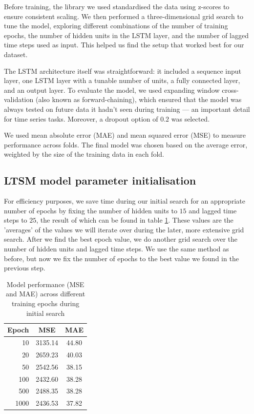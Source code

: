 \documentclass[conference]{IEEEtran}
\begin{document}
Before training, the library we used standardised the data using z-scores to ensure consistent scaling. We 
then performed a three-dimensional grid search to tune the model, exploring different combinations of the 
number of training epochs, the number of hidden units in the LSTM layer, and the number of lagged time 
steps used as input. This helped us find the setup that worked best for our dataset.

The LSTM architecture itself was straightforward: it included a sequence input layer, one LSTM layer with 
a tunable number of units, a fully connected layer, and an output layer. To evaluate the model, we used 
expanding window cross-validation (also known as forward-chaining), which ensured that the model was 
always tested on future data it hadn’t seen during training — an important detail for time series tasks.
Moreover, a dropout option of $0.2$ was selected.

We used mean absolute error (MAE) and mean squared error (MSE) to measure performance across folds. The 
final model was chosen based on the average error, weighted by the size of the training data in each fold.

\subsection{LTSM model parameter initialisation}
For efficiency purposes, we save time during our initial search for an appropriate number of epochs by 
fixing the number of hidden units to $15$ and lagged time steps to $25$, the result of which can be found in table \ref{tab:epoch_performance}. 
These values are the 'averages'
of the values we will iterate over during the later, more extensive grid search. 
After we find the best epoch value, we do another grid search over the number of hidden units and lagged
time steps. We use the same method as before, but now we fix the number of epochs to the best value
we found in the previous step. 

\begin{table}[h!]
    \centering
    \begin{tabular}{rcc}
    \hline
    \textbf{Epoch} & \textbf{MSE} & \textbf{MAE} \\
    \hline
    10   & 3135.14 & 44.80 \\
    20   & 2659.23 & 40.03 \\
    50   & 2542.56 & 38.15 \\
    100  & 2432.60 & 38.28 \\
    500  & 2488.35 & 38.28 \\
    1000 & 2436.53 & 37.82 \\
    \hline
    \end{tabular}
    \caption{Model performance (MSE and MAE) across different training epochs during initial search}
    \label{tab:epoch_performance}
\end{table}  
\end{document}
